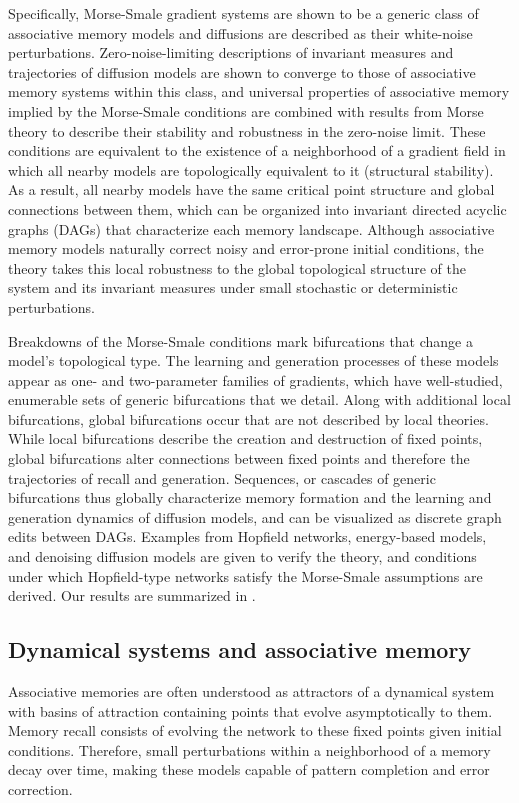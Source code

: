 \documentclass[12pt]{article}
\begin{document}
Specifically, Morse-Smale gradient systems are shown to be a generic class of associative memory models and diffusions are described as their white-noise perturbations. Zero-noise-limiting descriptions of invariant measures and trajectories of diffusion models are shown to converge to those of associative memory systems within this class, and universal properties of associative memory implied by the Morse-Smale conditions are combined with results from Morse theory to describe their stability and robustness in the zero-noise limit. These conditions are equivalent to the existence of a neighborhood of a gradient field in which all nearby models are topologically equivalent to it (structural stability). As a result, all nearby models have the same critical point structure and global connections between them, which can be organized into invariant directed acyclic graphs (DAGs) that characterize each memory landscape. Although associative memory models naturally correct noisy and error-prone initial conditions, the theory takes this local robustness to the global topological structure of the system and its invariant measures under small stochastic or deterministic perturbations.

Breakdowns of the Morse-Smale conditions mark bifurcations that change a model's topological type. The learning and generation processes of these models appear as one- and two-parameter families of gradients, which have well-studied, enumerable sets of generic bifurcations that we detail. Along with additional local bifurcations, global bifurcations occur that are not described by local theories. While local bifurcations describe the creation and destruction of fixed points, global bifurcations alter connections between fixed points and therefore the trajectories of recall and generation. Sequences, or cascades of generic bifurcations thus globally characterize memory formation and the learning and generation dynamics of diffusion models, and can be visualized as discrete graph edits between DAGs. Examples from Hopfield networks, energy-based models, and denoising diffusion models are given to verify the theory, and conditions under which Hopfield-type networks satisfy the Morse-Smale assumptions are derived. Our results are summarized in .



\subsection{Dynamical systems and associative memory}
Associative memories are often understood as attractors of a dynamical system with basins of attraction containing points that evolve asymptotically to them. Memory recall consists of evolving the network to these fixed points given initial conditions. Therefore, small perturbations within a neighborhood of a memory decay over time, making these models capable of pattern completion and error correction. 
\end{document}

